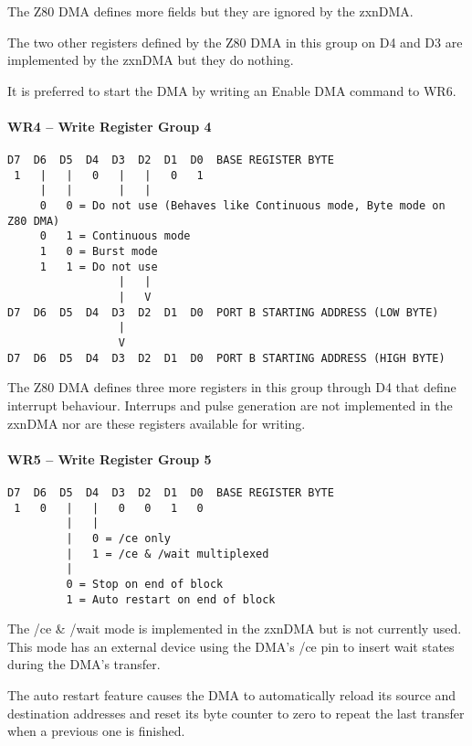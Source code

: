 \begin{multicols}{2}
The Z80 DMA defines more fields but they are ignored by the zxnDMA.

The two other registers defined by the Z80 DMA in this group on D4 and
D3 are implemented by the zxnDMA but they do nothing.

It is preferred to start the DMA by writing an Enable DMA command to
WR6.

\paragraph{WR4 – Write Register Group 4}
\begin{verbatim}
D7  D6  D5  D4  D3  D2  D1  D0  BASE REGISTER BYTE
 1   |   |   0   |   |   0   1
     |   |       |   |
     0   0 = Do not use (Behaves like Continuous mode, Byte mode on Z80 DMA)
     0   1 = Continuous mode
     1   0 = Burst mode
     1   1 = Do not use
                 |   |
                 |   V
D7  D6  D5  D4  D3  D2  D1  D0  PORT B STARTING ADDRESS (LOW BYTE)
                 |
                 V
D7  D6  D5  D4  D3  D2  D1  D0  PORT B STARTING ADDRESS (HIGH BYTE)
\end{verbatim}

The Z80 DMA defines three more registers in this group through D4 that
define interrupt behaviour. Interrups and pulse generation are not
implemented in the zxnDMA nor are these registers available for
writing.

\paragraph{WR5 – Write Register Group 5}
\begin{verbatim}
D7  D6  D5  D4  D3  D2  D1  D0  BASE REGISTER BYTE
 1   0   |   |   0   0   1   0
         |   |
         |   0 = /ce only
         |   1 = /ce & /wait multiplexed
         |
         0 = Stop on end of block
         1 = Auto restart on end of block
\end{verbatim}
The /ce \& /wait mode is implemented in the zxnDMA but is not currently
used. This mode has an external device using the DMA's /ce pin to
insert wait states during the DMA's transfer.

The auto restart feature causes the DMA to automatically reload its
source and destination addresses and reset its byte counter to zero to
repeat the last transfer when a previous one is finished.


\end{multicols}
